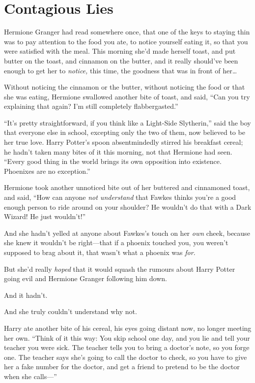 \chapter{Contagious Lies}\label{contagious-lies}

Hermione Granger had read somewhere once, that one of the keys to
staying thin was to pay attention to the food you ate, to notice
yourself eating it, so that you were satisfied with the meal. This
morning she'd made herself toast, and put butter on the toast, and
cinnamon on the butter, and it really should've been enough to get her
to \emph{notice,} this time, the goodness that was in front of
her\ldots{}

Without noticing the cinnamon or the butter, without noticing the food
or that she was eating, Hermione swallowed another bite of toast, and
said, ``Can you try explaining that again? I'm still completely
flabbergasted.''

``It's pretty straightforward, if you think like a Light-Side
Slytherin,'' said the boy that everyone else in school, excepting only
the two of them, now believed to be her true love. Harry Potter's spoon
absentmindedly stirred his breakfast cereal; he hadn't taken many bites
of it this morning, not that Hermione had seen. ``Every good thing in
the world brings its own opposition into existence. Phoenixes are no
exception.''

Hermione took another unnoticed bite out of her buttered and cinnamoned
toast, and said, ``How can anyone \emph{not understand} that Fawkes
thinks you're a good enough person to ride around on your shoulder? He
wouldn't do that with a Dark Wizard! He just wouldn't!''

And she hadn't yelled at anyone about Fawkes's touch on her \emph{own}
cheek, because she knew it wouldn't be right---that if a phoenix touched
you, you weren't supposed to brag about it, that wasn't what a phoenix
was \emph{for}.

But she'd really \emph{hoped} that it would squash the rumours about
Harry Potter going evil and Hermione Granger following him down.

And it hadn't.

And she truly couldn't understand why not.

Harry ate another bite of his cereal, his eyes going distant now, no
longer meeting her own. ``Think of it this way: You skip school one day,
and you lie and tell your teacher you were sick. The teacher tells you
to bring a doctor's note, so you forge one. The teacher says she's going
to call the doctor to check, so you have to give her a fake number for
the doctor, and get a friend to pretend to be the doctor when she
calls---''

